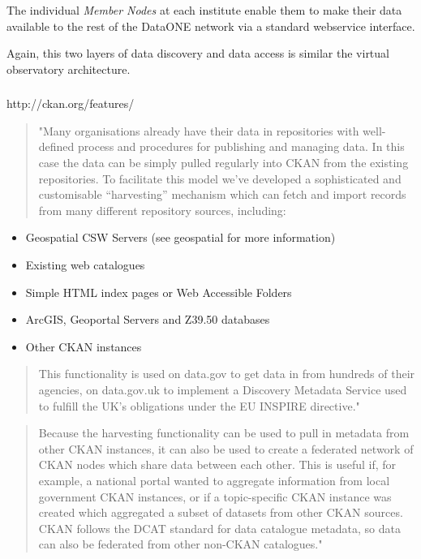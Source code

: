 \documentclass{article}
\begin{document}
The individual \textit{Member Nodes}
at each institute enable them to make their data available
to the rest of the DataONE network
via a standard webservice interface.

Again, this two layers of data discovery and data access
is similar the virtual observatory architecture.

\subsubsection{}

http://ckan.org/features/
\begin{quote}
"Many organisations already have their data in repositories with well-defined process and procedures
for publishing and managing data. In this case the data can be simply pulled regularly into CKAN
from the existing repositories. To facilitate this model we’ve developed a sophisticated and
customisable “harvesting” mechanism which can fetch and import records from many different
repository sources, including:
\end{quote}
\begin{itemize}
\item Geospatial CSW Servers (see geospatial for more information)
\item Existing web catalogues
\item Simple HTML index pages or Web Accessible Folders
\item ArcGIS, Geoportal Servers and Z39.50 databases
\item Other CKAN instances
\end{itemize}
\begin{quote}
This functionality is used on data.gov to get data in from hundreds of their agencies,
on data.gov.uk to implement a Discovery Metadata Service used to fulfill the UK’s
obligations under the EU INSPIRE directive."
\end{quote}

\begin{quote}
Because the harvesting functionality can be used to pull in metadata from other CKAN instances,
it can also be used to create a federated network of CKAN nodes which share data between each other.
This is useful if, for example, a national portal wanted to aggregate information from local
government CKAN instances, or if a topic-specific CKAN instance was created which aggregated
a subset of datasets from other CKAN sources. CKAN follows the DCAT standard for data catalogue
metadata, so data can also be federated from other non-CKAN catalogues." 
\end{quote}
\end{document}
